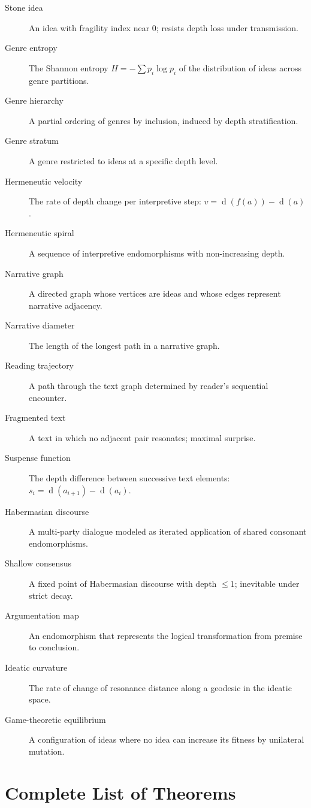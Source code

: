 \documentclass[11pt,openany]{book}
\theoremstyle{definition}
\theoremstyle{plain}
\theoremstyle{remark}
\newcommand{\depth}{\operatorname{d}}       %
\begin{document}
\begin{description}
\item[Stone idea] An idea with fragility index near 0; resists depth loss under transmission.
\item[Genre entropy] The Shannon entropy $H = -\sum p_i \log p_i$ of the distribution of ideas across genre partitions.
\item[Genre hierarchy] A partial ordering of genres by inclusion, induced by depth stratification.
\item[Genre stratum] A genre restricted to ideas at a specific depth level.
\item[Hermeneutic velocity] The rate of depth change per interpretive step: $v = \depth(f(a)) - \depth(a)$.
\item[Hermeneutic spiral] A sequence of interpretive endomorphisms with non-increasing depth.
\item[Narrative graph] A directed graph whose vertices are ideas and whose edges represent narrative adjacency.
\item[Narrative diameter] The length of the longest path in a narrative graph.
\item[Reading trajectory] A path through the text graph determined by reader's sequential encounter.
\item[Fragmented text] A text in which no adjacent pair resonates; maximal surprise.
\item[Suspense function] The depth difference between successive text elements: $s_i = \depth(a_{i+1}) - \depth(a_i)$.
\item[Habermasian discourse] A multi-party dialogue modeled as iterated application of shared consonant endomorphisms.
\item[Shallow consensus] A fixed point of Habermasian discourse with depth $\leq 1$; inevitable under strict decay.
\item[Argumentation map] An endomorphism that represents the logical transformation from premise to conclusion.
\item[Ideatic curvature] The rate of change of resonance distance along a geodesic in the ideatic space.
\item[Game-theoretic equilibrium] A configuration of ideas where no idea can increase its fitness by unilateral mutation.
\end{description}

\chapter{Complete List of Theorems}
\label{app:theorem-list}
\end{document}
